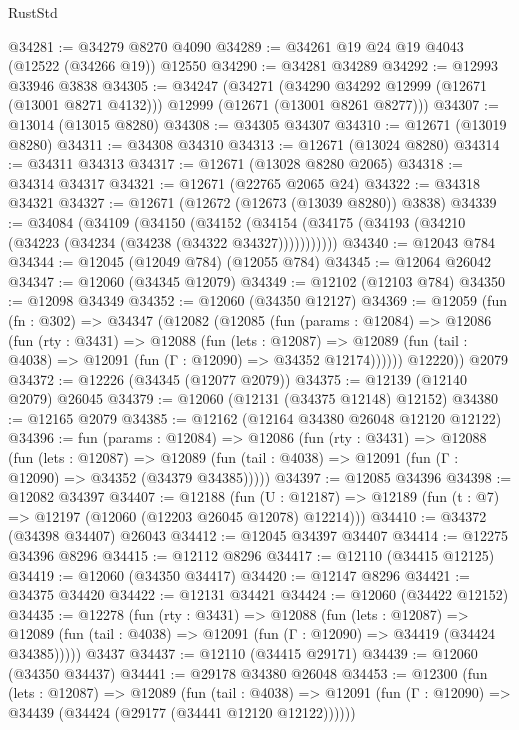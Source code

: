 \begin{lexlean}{RustStd}
\begin{coremodule}
@34281 := @34279 @8270 @4090
@34289 := @34261 @19 @24 @19 @4043 (@12522 (@34266 @19)) @12550
@34290 := @34281 @34289
@34292 := @12993 @33946 @3838
@34305 := @34247
    (@34271
      (@34290 @34292 @12999 (@12671 (@13001 @8271 @4132)))
      @12999
      (@12671 (@13001 @8261 @8277)))
@34307 := @13014 (@13015 @8280)
@34308 := @34305 @34307
@34310 := @12671 (@13019 @8280)
@34311 := @34308 @34310
@34313 := @12671 (@13024 @8280)
@34314 := @34311 @34313
@34317 := @12671 (@13028 @8280 @2065)
@34318 := @34314 @34317
@34321 := @12671 (@22765 @2065 @24)
@34322 := @34318 @34321
@34327 := @12671 (@12672 (@12673 (@13039 @8280)) @3838)
@34339 := @34084
    (@34109
      (@34150
        (@34152 (@34154 (@34175 (@34193 (@34210 (@34223 (@34234 (@34238 (@34322 @34327)))))))))))
@34340 := @12043 @784
@34344 := @12045 (@12049 @784) (@12055 @784)
@34345 := @12064 @26042
@34347 := @12060 (@34345 @12079)
@34349 := @12102 (@12103 @784)
@34350 := @12098 @34349
@34352 := @12060 (@34350 @12127)
@34369 := @12059
    (fun (fn : @302) =>
    @34347
      (@12082
        (@12085
          (fun (params : @12084) =>
          @12086
            (fun (rty : @3431) =>
            @12088
              (fun (lets : @12087) =>
              @12089 (fun (tail : @4038) => @12091 (fun (Γ : @12090) => @34352 @12174))))))
        @12220))
    @2079
@34372 := @12226 (@34345 (@12077 @2079))
@34375 := @12139 (@12140 @2079) @26045
@34379 := @12060 (@12131 (@34375 @12148) @12152)
@34380 := @12165 @2079
@34385 := @12162 (@12164 @34380 @26048 @12120 @12122)
@34396 := fun (params : @12084) =>
  @12086
    (fun (rty : @3431) =>
    @12088
      (fun (lets : @12087) =>
      @12089 (fun (tail : @4038) => @12091 (fun (Γ : @12090) => @34352 (@34379 @34385)))))
@34397 := @12085 @34396
@34398 := @12082 @34397
@34407 := @12188
    (fun (U : @12187) => @12189 (fun (t : @7) => @12197 (@12060 (@12203 @26045 @12078) @12214)))
@34410 := @34372 (@34398 @34407) @26043
@34412 := @12045 @34397 @34407
@34414 := @12275 @34396 @8296
@34415 := @12112 @8296
@34417 := @12110 (@34415 @12125)
@34419 := @12060 (@34350 @34417)
@34420 := @12147 @8296
@34421 := @34375 @34420
@34422 := @12131 @34421
@34424 := @12060 (@34422 @12152)
@34435 := @12278
    (fun (rty : @3431) =>
    @12088
      (fun (lets : @12087) =>
      @12089 (fun (tail : @4038) => @12091 (fun (Γ : @12090) => @34419 (@34424 @34385)))))
    @3437
@34437 := @12110 (@34415 @29171)
@34439 := @12060 (@34350 @34437)
@34441 := @29178 @34380 @26048
@34453 := @12300
    (fun (lets : @12087) =>
    @12089
      (fun (tail : @4038) =>
      @12091 (fun (Γ : @12090) => @34439 (@34424 (@29177 (@34441 @12120 @12122))))))

\end{coremodule}
\end{lexlean}
